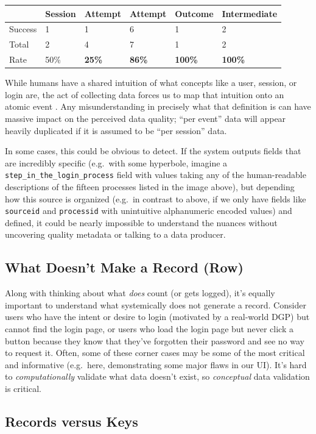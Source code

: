 \documentclass[
]{krantz}
\begin{document}
\begin{longtable}[]{@{}llllll@{}}
\toprule
& Session & Attempt & Attempt & Outcome & Intermediate\tabularnewline
\midrule
\endhead
Success & 1 & 1 & 6 & 1 & 2\tabularnewline
Total & 2 & 4 & 7 & 1 & 2\tabularnewline
Rate & 50\% & \textbf{25\%} & \textbf{86\%} & \textbf{100\%} & \textbf{100\%}\tabularnewline
\bottomrule
\end{longtable}

While humans have a shared intuition of what concepts like a user, session, or login are, the act of collecting data forces us to map that intuition onto an atomic event .
Any misunderstanding in precisely what that definition is can have massive impact on the perceived data quality; ``per event'' data will appear heavily duplicated if it is assumed to be ``per session'' data.

In some cases, this could be obvious to detect.
If the system outputs fields that are incredibly specific (e.g.~with some hyperbole, imagine a \texttt{step\_in\_the\_login\_process} field with values taking any of the human-readable descriptions of the fifteen processes listed in the image above), but depending how this source is organized (e.g.~in contrast to above, if we only have fields like \texttt{sourceid} and \texttt{processid} with unintuitive alphanumeric encoded values) and defined, it could be nearly impossible to understand the nuances without uncovering quality metadata or talking to a data producer.

\hypertarget{what-doesnt-make-a-record-row}{%
\subsection{What Doesn't Make a Record (Row)}\label{what-doesnt-make-a-record-row}}

Along with thinking about what \emph{does} count (or gets logged), it's equally important to understand what systemically does not generate a record. Consider users who have the intent or desire to login (motivated by a real-world DGP) but cannot find the login page, or users who load the login page but never click a button because they know that they've forgotten their password and see no way to request it.
Often, some of these corner cases may be some of the most critical and informative (e.g.~here, demonstrating some major flaws in our UI).
It's hard to \emph{computationally} validate what data doesn't exist, so \emph{conceptual} data validation is critical.

\hypertarget{records-versus-keys}{%
\subsection{Records versus Keys}\label{records-versus-keys}}
\end{document}
